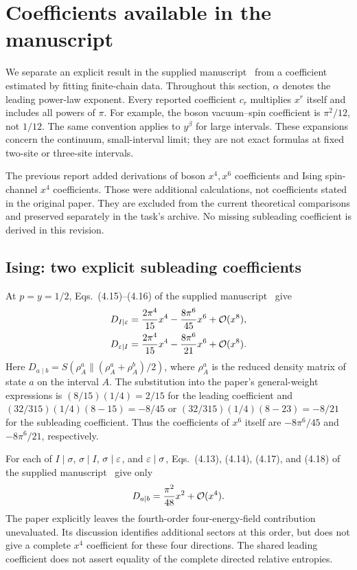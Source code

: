 \clearpage
\section{Coefficients available in the manuscript}
\label{sec:coefficients}
We separate an explicit result in the supplied manuscript~\cite{theory}
from a coefficient estimated by fitting finite-chain data. Throughout this
section, $\alpha$ denotes the leading power-law exponent. Every reported
coefficient $c_r$ multiplies $x^r$ itself and includes all powers of $\pi$.
For example, the boson vacuum--spin coefficient is $\pi^2/12$, not
$1/12$. The same convention applies to $y^\beta$ for large intervals.
These expansions concern the continuum,
small-interval limit; they are not exact formulas at fixed two-site or
three-site intervals.

The previous report added derivations of boson $x^4,x^6$ coefficients and
Ising spin-channel $x^4$ coefficients. Those were additional calculations,
not coefficients stated in the original paper. They are excluded from the
current theoretical comparisons and preserved separately in the task's
archive. No missing subleading coefficient is derived in this revision.

\subsection{Ising: two explicit subleading coefficients}
At $p=y=1/2$, Eqs.~(4.15)--(4.16) of the supplied manuscript~\cite{theory} give
\begin{align}
 D_{I\mid\varepsilon}
 &=\frac{2\pi^4}{15}x^4-\frac{8\pi^6}{45}x^6+\mathcal O(x^8),
 \label{eq:Ieps}\\
 D_{\varepsilon\mid I}
 &=\frac{2\pi^4}{15}x^4-\frac{8\pi^6}{21}x^6+\mathcal O(x^8).
 \label{eq:epsI}
\end{align}
Here $D_{a\mid b}=S(\rho_A^a\|(\rho_A^a+\rho_A^b)/2)$, where
$\rho_A^a$ is the reduced density matrix of state $a$ on the interval $A$.
The substitution into the paper's general-weight expressions is
$(8/15)(1/4)=2/15$ for the leading coefficient and
$(32/315)(1/4)(8-15)=-8/45$ or
$(32/315)(1/4)(8-23)=-8/21$ for the subleading coefficient.
Thus the coefficients of $x^6$ itself are $-8\pi^6/45$ and
$-8\pi^6/21$, respectively.

For each of $I\mid\sigma$, $\sigma\mid I$, $\sigma\mid\varepsilon$, and
$\varepsilon\mid\sigma$, Eqs.~(4.13), (4.14), (4.17), and (4.18)
of the supplied manuscript~\cite{theory} give only
\begin{equation}
 D_{a\mid b}=\frac{\pi^2}{48}x^2+\mathcal O(x^4).
 \label{eq:spinleading}
\end{equation}
The paper explicitly leaves the fourth-order four-energy-field
contribution unevaluated. Its discussion identifies additional sectors
at this order, but does not give a complete $x^4$ coefficient for these
four directions. The shared leading coefficient does not assert equality
of the complete directed relative entropies.

